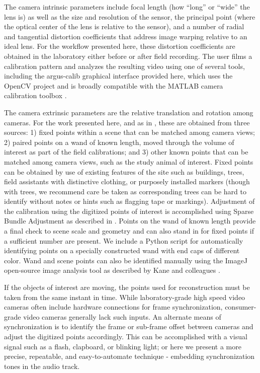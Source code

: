 \documentclass[fleqn,10pt]{wlpeerj}
\begin{document}
The camera intrinsic parameters include focal length (how ``long'' or ``wide'' the lens is) as well as the size and resolution of the sensor, the principal point (where the optical center of the lens is relative to the sensor), and a number of radial and tangential distortion coefficients that address image warping relative to an ideal lens. For the workflow presented here, these distortion coefficients are obtained in the laboratory either before or after field recording.  The user films a calibration pattern and analyzes the resulting video using one of several tools, including the argus-calib graphical interface provided here, which uses the OpenCV project \citep{opencv} and is broadly compatible with the MATLAB camera calibration toolbox \citep{lour09}.  

The camera extrinsic parameters are the relative translation and rotation among cameras.  For the work presented here, and as in \citep{Theriault:2014}, these are obtained from three sources: 1) fixed points within a scene that can be matched among camera views; 2) paired points on a wand of known length, moved through the volume of interest as part of the field calibrations; and 3) other known points that can be matched among camera views, such as the study animal of interest. Fixed points can be obtained by use of existing features of the site such as buildings, trees, field assistants with distinctive clothing, or purposely installed markers (though with trees, we recommend care be taken as corresponding trees can be hard to identify without notes or hints such as flagging tape or markings).  Adjustment of the calibration using the digitized points of interest is accomplished using Sparse Bundle Adjustment as described in \citep{lour09, Theriault:2014}.  Points on the wand of known length provide a final check to scene scale and geometry and can also stand in for fixed points if a sufficient number are present. We include a Python script for automatically identifying points on a specially constructed wand with end caps of different color. Wand and scene points can also be identified manually using the ImageJ open-source image analysis tool as described by Kane and colleagues \citep{Kane2012}.

If the objects of interest are moving, the points used for reconstruction must be taken from the same instant in time.  While laboratory-grade high speed video cameras often include hardware connections for frame synchronization, consumer-grade video cameras generally lack such inputs. An alternate means of synchronization is to identify the frame or sub-frame offset between cameras and adjust the digitized points accordingly.  This can be accomplished with a visual signal such as a flash, clapboard, or blinking light; or here we present a more precise, repeatable, and easy-to-automate technique - embedding synchronization tones in the audio track. 
\end{document}
